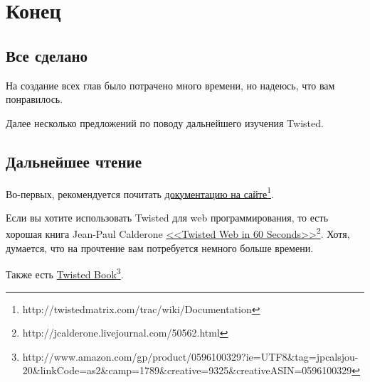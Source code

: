 
\section{Конец\label{sec:part22}}

\subsection{Все сделано}

На создание всех глав было потрачено много времени, но надеюсь, что 
вам понравилось.



Далее несколько предложений по поводу дальнейшего изучения Twisted.

\subsection{Дальнейшее чтение}


Во-первых, рекомендуется почитать 
\href{http://twistedmatrix.com/trac/wiki/Documentation}{документацию на сайте}\footnote[1]{http://twistedmatrix.com/trac/wiki/Documentation}.


Если вы хотите использовать Twisted для web программирования, то 
есть хорошая книга Jean-Paul Calderone
\href{http://jcalderone.livejournal.com/50562.html}{<<Twisted Web in 60 Seconds>>}\footnote[2]{http://jcalderone.livejournal.com/50562.html}. Хотя, думается, что на прочтение вам 
потребуется немного больше времени. 


Также есть 
\href{http://www.amazon.com/gp/product/0596100329?ie=UTF8\&tag=jpcalsjou-20\&linkCode=as2\&camp=1789\&creative=9325\&creativeASIN=0596100329}{Twisted Book}\footnote[3]{http://www.amazon.com/gp/product/0596100329?ie=UTF8\&tag=jpcalsjou-20\&linkCode=as2\&camp=1789\&creative=9325\&creativeASIN=0596100329}.


